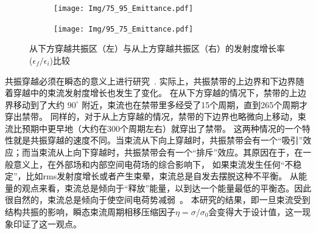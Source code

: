 \begin{figure}[thbp]
    \centering
    \begin{subfigure}[b]{0.48\textwidth}
        \centering
        \texttt{[image: Img/75\_95\_Emittance.pdf]}
        \caption{}
        \label{sfig:75_95emittance}
    \end{subfigure}
    \begin{subfigure}[b]{0.48\textwidth}
        \centering
        \texttt{[image: Img/95\_75\_Emittance.pdf]}
        \caption{}
        \label{sfig:95_75emittance}
    \end{subfigure}
    \caption{从下方穿越共振区（左）与从上方穿越共振区（右）的发射度增长率($\epsilon_f/\epsilon_i$)比较
     }
    \label{fig:emittance}
\end{figure}

共振穿越必须在瞬态的意义上进行研究~\cite{12}. 实际上，共振禁带的上边界和下边界随着穿越中的束流发射度增长也发生了变化。
在从下方穿越的情况下，禁带的上边界移动到了大约 $90^{\circ}$ 附近，束流也在禁带里多经受了15个周期，直到265个周期才穿出禁带。
同样的，对于从上方穿越的情况，禁带的下边界也略微向上移动，束流比预期中更早地（大约在300个周期左右）就穿出了禁带。
这两种情况的一个特性就是共振穿越的速度不同。当束流从下向上穿越时，共振禁带会有一个“吸引”效应；而当束流从上向下穿越时，共振禁带会有一个“排斥”效应。其原因在于，在一般意义上，在外部场和内部空间电荷场的综合影响下，
如果束流发生任何“不稳定”，比如rms发射度增长或者产生束晕，束流总是自发去摆脱这种不平衡。
从能量的观点来看，束流总是倾向于“释放”能量，以到达一个能量最低的平衡态。因此很自然的，束流总是倾向于使空间电荷势减弱~\cite{17}。
本研究的结果，即一旦束流受到结构共振的影响，瞬态束流周期相移压缩因子$\eta=\sigma/\sigma_0$会变得大于设计值，这一现象印证了这一观点。

